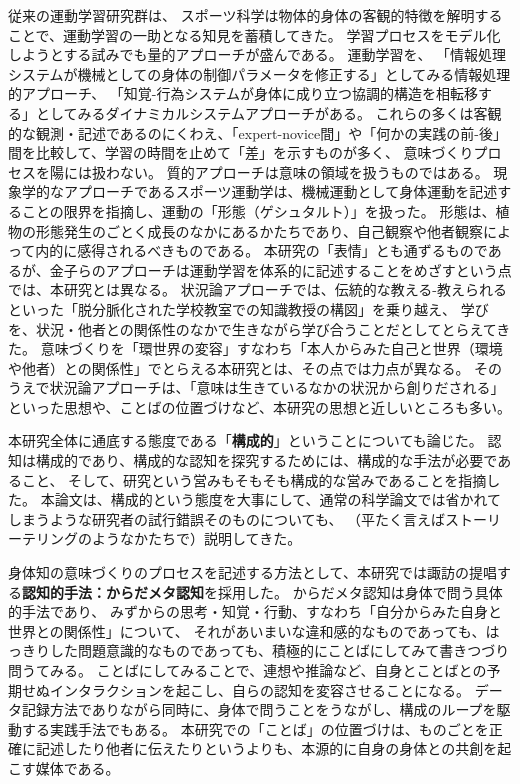 従来の運動学習研究群は、
スポーツ科学は物体的身体の客観的特徴を解明することで、運動学習の一助となる知見を蓄積してきた。
学習プロセスをモデル化しようとする試みでも量的アプローチが盛んである。
運動学習を、
「情報処理システムが機械としての身体の制御パラメータを修正する」としてみる情報処理的アプローチ、
「知覚-行為システムが身体に成り立つ協調的構造を相転移する」としてみるダイナミカルシステムアプローチがある。
これらの多くは客観的な観測・記述であるのにくわえ、「expert-novice間」や「何かの実践の前-後」間を比較して、学習の時間を止めて「差」を示すものが多く、
意味づくりプロセスを陽には扱わない。
質的アプローチは意味の領域を扱うものではある。
現象学的なアプローチであるスポーツ運動学は、機械運動として身体運動を記述することの限界を指摘し、運動の「形態（ゲシュタルト）」を扱った。
形態は、植物の形態発生のごとく成長のなかにあるかたちであり、自己観察や他者観察によって内的に感得されるべきものである。
本研究の「表情」とも通ずるものであるが、金子らのアプローチは運動学習を体系的に記述することをめざすという点では、本研究とは異なる。
状況論アプローチでは、伝統的な教える-教えられるといった「脱分脈化された学校教室での知識教授の構図」を乗り越え、
学びを、状況・他者との関係性のなかで生きながら学び合うことだとしてとらえてきた。
意味づくりを「環世界の変容」すなわち「本人からみた自己と世界（環境や他者）との関係性」でとらえる本研究とは、その点では力点が異なる。
そのうえで状況論アプローチは、「意味は生きているなかの状況から創りだされる」といった思想や、ことばの位置づけなど、本研究の思想と近しいところも多い。

本研究全体に通底する態度である「\textbf{構成的}」ということについても論じた。
認知は構成的であり、構成的な認知を探究するためには、構成的な手法が必要であること、
そして、研究という営みもそもそも構成的な営みであることを指摘した。
本論文は、構成的という態度を大事にして、通常の科学論文では省かれてしまうような研究者の試行錯誤そのものについても、
（平たく言えばストーリーテリングのようなかたちで）説明してきた。

身体知の意味づくりのプロセスを記述する方法として、本研究では諏訪の提唱する\textbf{認知的手法：からだメタ認知}を採用した。
からだメタ認知は身体で問う具体的手法であり、
みずからの思考・知覚・行動、すなわち「自分からみた自身と世界との関係性」について、
それがあいまいな違和感的なものであっても、はっきりした問題意識的なものであっても、積極的にことばにしてみて書きつづり問うてみる。
ことばにしてみることで、連想や推論など、自身とことばとの予期せぬインタラクションを起こし、自らの認知を変容させることになる。
データ記録方法でありながら同時に、身体で問うことをうながし、構成のループを駆動する実践手法でもある。
本研究での「ことば」の位置づけは、ものごとを正確に記述したり他者に伝えたりというよりも、本源的に自身の身体との共創を起こす媒体である。

